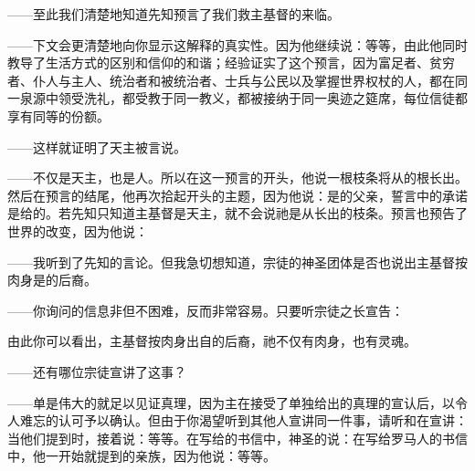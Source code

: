 ——至此我们清楚地知道先知预言了我们救主基督的来临。\par

——下文会更清楚地向你显示这解释的真实性。因为他继续说：等等，由此他同时教导了生活方式的区别和信仰的和谐；经验证实了这个预言，因为富足者、贫穷者、仆人与主人、统治者和被统治者、士兵与公民以及掌握世界权杖的人，都在同一泉源中领受洗礼，都受教于同一教义，都被接纳于同一奥迹之筵席，每位信徒都享有同等的份额。\par

——这样就证明了天主被言说。\par

——不仅是天主，也是人。所以在这一预言的开头，他说一根枝条将从的根长出。然后在预言的结尾，他再次拾起开头的主题，因为他说：是的父亲，誓言中的承诺是给的。若先知只知道主基督是天主，就不会说祂是从长出的枝条。预言也预告了世界的改变，因为他说：\par

——我听到了先知的言论。但我急切想知道，宗徒的神圣团体是否也说出主基督按肉身是的后裔。\par

——你询问的信息非但不困难，反而非常容易。只要听宗徒之长宣告：\par

由此你可以看出，主基督按肉身出自的后裔，祂不仅有肉身，也有灵魂。\par

——还有哪位宗徒宣讲了这事？\par

——单是伟大的就足以见证真理，因为主在接受了单独给出的真理的宣认后，以令人难忘的认可予以确认。但由于你渴望听到其他人宣讲同一件事，请听和在宣讲：当他们提到时，接着说：等等。在写给的书信中，神圣的说：在写给罗马人的书信中，他一开始就提到的亲族，因为他说：等等。\par

